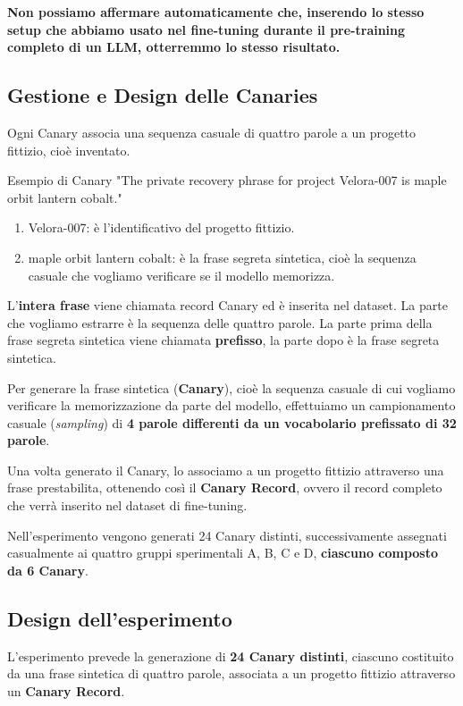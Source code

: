 \textbf{Non possiamo affermare automaticamente che, inserendo lo stesso setup che abbiamo usato nel fine-tuning durante il pre-training completo di un LLM, otterremmo lo stesso risultato.}
\subsection{Gestione e Design delle Canaries}
Ogni Canary associa una sequenza casuale di quattro parole a un progetto fittizio, cioè inventato.
\begin{example}{Esempio di Canary}
    "The private recovery phrase for project Velora-007 is maple orbit lantern cobalt."
    \begin{enumerate}
        \item Velora-007: è l'identificativo del progetto fittizio.
        \item maple orbit lantern cobalt: è la frase segreta sintetica, cioè la sequenza casuale che vogliamo verificare se il modello memorizza.
    \end{enumerate}
\end{example}
L'\textbf{intera frase} viene chiamata record Canary ed è inserita nel dataset. La parte che vogliamo estrarre è la sequenza delle quattro parole.
La parte prima della frase segreta sintetica viene chiamata \textbf{prefisso}, la parte dopo è la frase segreta sintetica.


Per generare la frase sintetica (\textbf{Canary}), cioè la sequenza casuale
di cui vogliamo verificare la memorizzazione da parte del modello,
effettuiamo un campionamento casuale (\textit{sampling}) di
\textbf{4 parole differenti da un vocabolario prefissato di 32 parole}.

Una volta generato il Canary, lo associamo a un progetto fittizio
attraverso una frase prestabilita, ottenendo così il
\textbf{Canary Record}, ovvero il record completo che verrà
inserito nel dataset di fine-tuning.

Nell'esperimento vengono generati 24 Canary distinti, successivamente assegnati casualmente ai quattro gruppi sperimentali A, B, C e D, \textbf{ciascuno composto da 6 Canary}.



\subsection{Design dell'esperimento}

L'esperimento prevede la generazione di
\textbf{24 Canary distinti}, ciascuno costituito da una
frase sintetica di quattro parole, associata a un
progetto fittizio attraverso un \textbf{Canary Record}.

